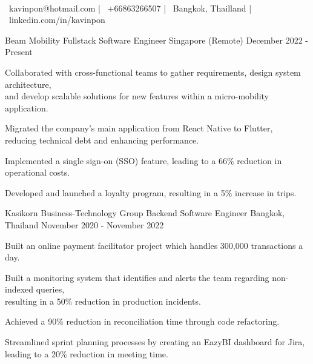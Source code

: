 \documentclass[]{awesome-cv}
\begin{document}
\begin{center}
	  \\
	\vspace{2mm}
	{\faEnvelope\ kavinpon@hotmail.com} | {\faMobile\ +66863266507} | {\faMapMarker\ Bangkok, Thailland} | {\faLinkedin\ linkedin.com/in/kavinpon}
\end{center}
\begin{cventries}
	\cventry
	{Beam Mobility}
	{Fullstack Software Engineer}
	{Singapore (Remote)}
	{December 2022 - Present}
	{\begin{cvitems}
			\item {Collaborated with cross-functional teams to gather requirements, design system architecture,\\ and develop scalable solutions for new features within a micro-mobility application.}
			\item {Migrated the company's main application from React Native to Flutter,\\ reducing technical debt and enhancing performance.}
			\item {Implemented a single sign-on (SSO) feature, leading to a 66\% reduction in operational costs.}
			\item {Developed and launched a loyalty program, resulting in a 5\% increase in trips.}
		\end{cvitems}}
	\cventry
	{Kasikorn Business-Technology Group}
	{Backend Software Engineer}
	{Bangkok, Thailand}
	{November 2020 - November 2022}
	{\begin{cvitems}
			\item {Built an online payment facilitator project which handles 300,000 transactions a day.}
			\item {Built a monitoring system that identifies and alerts the team regarding non-indexed queries,\\ resulting in a 50\% reduction in production incidents.}
			\item {Achieved a 90\% reduction in reconciliation time through code refactoring.}
			\item {Streamlined sprint planning processes by creating an EazyBI dashboard for Jira,\\ leading to a 20\% reduction in meeting time.}
		\end{cvitems}}

\end{cventries}
\end{document}

